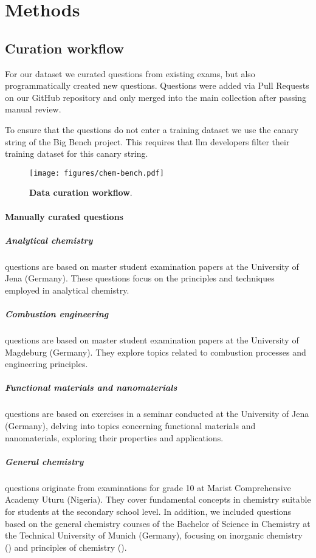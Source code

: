 \documentclass[11pt, oneside]{article}
\begin{document}
\section{Methods}

\subsection{Curation workflow}\label{sec:curation}
For our dataset we curated questions from existing exams, but also programmatically created new questions.
Questions were added via Pull Requests on our GitHub repository and only merged into the main collection after passing manual review.

To ensure that the questions do not enter a training dataset we use the canary string of the Big Bench project.
This requires that \Gls{llm} developers filter their training dataset for this canary string.

\begin{figure}
    \texttt{[image: figures/chem-bench.pdf]}
    \caption{\textbf{Data curation workflow}.}
\end{figure}

\paragraph{Manually curated questions}

\subparagraph{Analytical chemistry}
 questions are based on master student examination papers at the University of Jena (Germany). 
These questions focus on the principles and techniques employed in analytical chemistry.

\subparagraph{Combustion engineering}
 questions are based on master student examination papers at the University of Magdeburg (Germany). 
They explore topics related to combustion processes and engineering principles.

\subparagraph{Functional materials and nanomaterials}
  questions are based on exercises in a seminar conducted at the University of Jena (Germany), delving into topics concerning functional materials and nanomaterials, exploring their properties and applications.

\subparagraph{General chemistry}
 questions originate from examinations for grade 10 at Marist Comprehensive Academy Uturu (Nigeria). 
They cover fundamental concepts in chemistry suitable for students at the secondary school level.
In addition, we included questions based on the general chemistry courses of the Bachelor of Science in Chemistry at the Technical University of Munich (Germany), focusing on inorganic chemistry () and principles of chemistry ().
\end{document}
